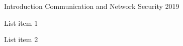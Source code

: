 \documentclass[Screen16to9,17pt,footrule]{foils}
\begin{document}
\mytitlepage
{Introduction}
{Communication and Network Security 2019}


\begin{list1}
\item List item 1
\item List item 2
\end{list1}



\end{document}
